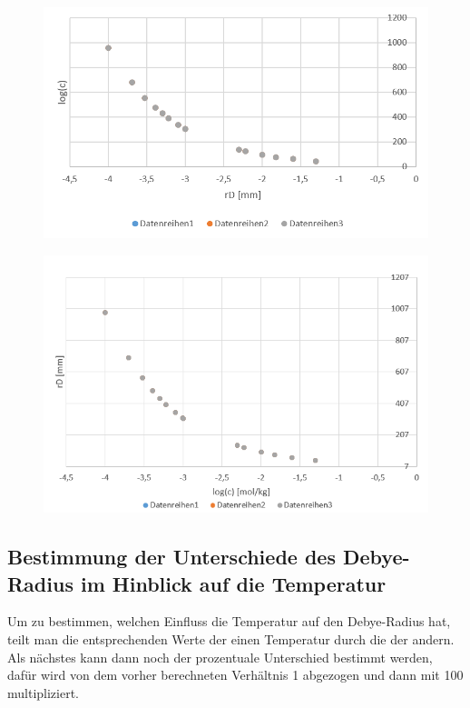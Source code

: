 \begin{figure}[H]
    \centering
    \includegraphics[scale=.7]{../src/img/graph3_25C.png}
\end{figure}

\begin{figure}[H]
    \centering
    \includegraphics[scale=.7]{../src/img/graph3_40C.png}
\end{figure}


\subsection{Bestimmung der Unterschiede des Debye-Radius im Hinblick auf die Temperatur}

Um zu bestimmen, welchen Einfluss die Temperatur auf den Debye-Radius hat, teilt man die entsprechenden Werte der einen Temperatur durch die der
andern. Als nächstes kann dann noch der prozentuale Unterschied bestimmt werden, dafür wird von dem vorher berechneten Verhältnis 1 abgezogen und
dann mit 100 multipliziert.


